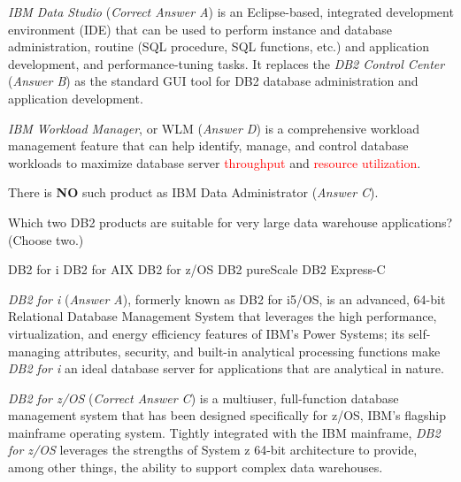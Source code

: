\documentclass[answers, 11pt]{exam}
\begin{document}
\begin{questions}
\begin{solution}
\textit{IBM Data Studio} (\textit{Correct Answer A}) is an Eclipse-based, integrated
development environment (IDE) that can be used to perform instance and database
administration, routine (SQL procedure, SQL functions, etc.) and application
development, and performance-tuning tasks. It replaces the \textit{DB2 Control Center} 
(\textit{Answer B}) as the standard GUI tool for DB2 database administration and
application development.
\par

\textit{IBM Workload Manager}, or WLM (\textit{Answer D}) is a comprehensive workload
management feature that can help identify, manage, and control database workloads to
maximize database server \textcolor{red}{throughput} and \textcolor{red}{resource
 utilization}.
\par

There is \textbf{NO} such product as IBM Data Administrator (\textit{Answer C}).

\end{solution}

\newpage
\addpoints

\question[1]
Which two DB2 products are suitable for very large data warehouse applications? (Choose two.)
\begin{choices}
\choice DB2 for i
\CorrectChoice DB2 for AIX
\CorrectChoice DB2 for z/OS
\choice DB2 pureScale
\choice DB2 Express-C
\end{choices}

\begin{solution}
\textit{DB2 for i} (\textit{Answer A}), formerly known as DB2 for i5/OS, is an
advanced, 64-bit Relational Database Management System that leverages the high
performance, virtualization, and energy efficiency features of IBM's Power Systems; 
its self-managing attributes, security, and built-in analytical processing functions
make \textit{DB2 for i} an ideal database server for {\color{red} applications that 
are analytical in nature}.
\par

\textit{DB2 for z/OS} (\textit{Correct Answer C}) is a multiuser, full-function
database management system that has been designed specifically for z/OS, 
IBM's flagship mainframe operating system. Tightly integrated with the IBM mainframe,
\textit{DB2 for z/OS} leverages the strengths of System z 64-bit architecture to
provide, among other things, the ability to support complex {\color{red} data
warehouses}. 
\par


\end{solution}
\end{questions}
\end{document}
